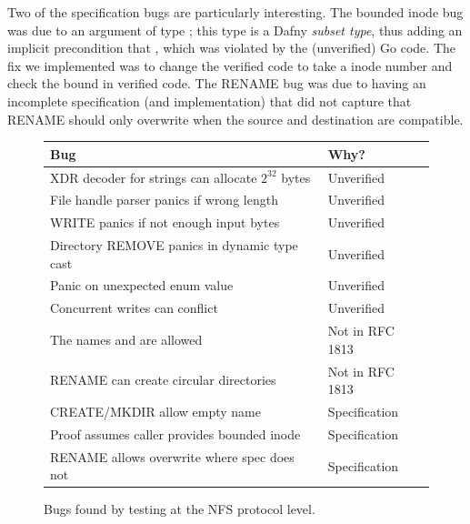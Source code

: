 Two of the specification bugs are particularly interesting. The bounded inode bug
was due to an  argument of type ; this type is a Dafny
\emph{subset type}, thus adding an implicit precondition that , which was violated by the (unverified) Go code. The fix we implemented was to change the verified code to take a  inode number and check the bound in verified code. The RENAME bug was due
to having an incomplete specification (and implementation) that did not capture
that RENAME should only overwrite when the source and destination are
compatible.

\begin{figure}
  \begin{center}
  \begin{tabular}{@{}p{8cm}p{2.7cm}@{}}
    \toprule
    \textbf{Bug} & \textbf{Why?} \\
    \midrule
    XDR decoder for strings can allocate $2^{32}$ bytes & Unverified \\
    File handle parser panics if wrong length & Unverified \\
    WRITE panics if not enough input bytes & Unverified \\
    Directory REMOVE panics in dynamic type cast & Unverified \\
    Panic on unexpected enum value & Unverified \\
    Concurrent writes can conflict & Unverified \\
    The names \cc{.} and \cc{..} are allowed & Not in RFC 1813 \\
    RENAME can create circular directories & Not in RFC 1813 \\
    CREATE/MKDIR allow empty name & Specification \\
    Proof assumes caller provides bounded inode & Specification \\
    RENAME allows overwrite where spec does not & Specification \\
    \bottomrule
  \end{tabular}
  \end{center}
  \tightenspace
  \caption{Bugs found by testing at the NFS protocol level.}
  \label{fig:daisynfs-bugs}
\end{figure}


